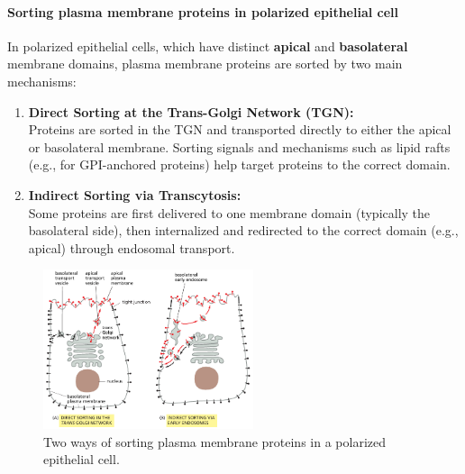 \documentclass[../main.tex]{subfiles}
\begin{document}
\paragraph{Sorting plasma membrane proteins in polarized epithelial cell}
In polarized epithelial cells, which have distinct \textbf{apical} and \textbf{basolateral} membrane domains, plasma membrane proteins are sorted by two main mechanisms:

\begin{enumerate}
	\item \textbf{Direct Sorting at the Trans-Golgi Network (TGN):} \\
	Proteins are sorted in the TGN and transported directly to either the apical or basolateral membrane. Sorting signals and mechanisms such as lipid rafts (e.g., for GPI-anchored proteins) help target proteins to the correct domain.
	
	\item \textbf{Indirect Sorting via Transcytosis:} \\
	Some proteins are first delivered to one membrane domain (typically the basolateral side), then internalized and redirected to the correct domain (e.g., apical) through endosomal transport.
\end{enumerate}

\begin{figure}[H]
	\centering
	\includegraphics[width= 0.55\textwidth]{49}
	\caption{Two ways of sorting plasma membrane proteins in a polarized epithelial cell.}
\end{figure}
\end{document}
